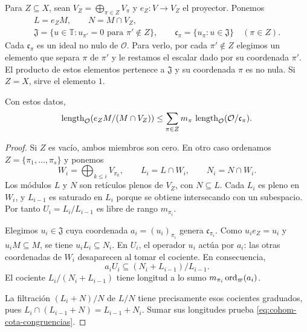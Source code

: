 Para $Z\subseteq X$, sean $V_Z=\bigoplus_{\pi\in Z}V_\pi$
y $e_Z:V\to V_Z$ el proyector. Ponemos
\begin{equation}
 \begin{gathered}
 L=e_ZM,\qquad N=M\cap V_Z,\\
 \mathfrak J=\{u\in\mathbb T:u_{\pi'}=0
       \text{ para }\pi'\notin Z\},\qquad
 \mathfrak c_\pi=\{u_\pi:u\in\mathfrak J\}\quad(\pi\in Z).
 \end{gathered}
 \label{eq:cohom-ideales}
\end{equation}
Cada $\mathfrak c_\pi$ es un ideal no nulo de $\mathcal O$.
Para verlo, por cada $\pi'\notin Z$ elegimos un elemento
que separa $\pi$ de $\pi'$ y le restamos el escalar
dado por su coordenada $\pi'$. El producto de estos
elementos pertenece a $\mathfrak J$ y su coordenada $\pi$
es no nula. Si $Z=X$, sirve el elemento $1$.

\begin{proposicion}
\label{prop:cohom-congruencias}
Con estos datos,
\begin{equation}
 \operatorname{length}_{\mathcal O}(e_ZM/(M\cap V_Z))
 \le\sum_{\pi\in Z}m_\pi\,
       \operatorname{length}_{\mathcal O}(\mathcal O/\mathfrak c_\pi).
 \label{eq:cohom-cota-congruencias}
\end{equation}
\end{proposicion}

\begin{proof}
Si $Z$ es vacío, ambos miembros son cero.
En otro caso ordenamos $Z=\{\pi_1,\ldots,\pi_s\}$ y ponemos
\[
 W_i=\bigoplus_{k\le i}V_{\pi_k},\qquad
 L_i=L\cap W_i,\qquad N_i=N\cap W_i.
\]
Los módulos $L$ y $N$ son retículos plenos de $V_Z$,
con $N\subseteq L$. Cada $L_i$ es pleno en $W_i$,
y $L_{i-1}$ es saturado en $L_i$ porque se obtiene
intersecando con un subespacio. Por tanto
$U_i=L_i/L_{i-1}$ es libre de rango $m_{\pi_i}$.

Elegimos $u_i\in\mathfrak J$ cuya coordenada
$a_i=(u_i)_{\pi_i}$ genera $\mathfrak c_{\pi_i}$.
Como $u_ie_Z=u_i$ y $u_iM\subseteq M$, se tiene
$u_iL_i\subseteq N_i$. En $U_i$, el operador $u_i$
actúa por $a_i$: las otras coordenadas de $W_i$
desaparecen al tomar el cociente. En consecuencia,
\[
 a_iU_i\subseteq (N_i+L_{i-1})/L_{i-1}.
\]
El cociente $L_i/(N_i+L_{i-1})$ tiene longitud a lo sumo
$m_{\pi_i}\operatorname{ord}_\varpi(a_i)$.

La filtración $(L_i+N)/N$ de $L/N$ tiene precisamente
esos cocientes graduados, pues
$L_i\cap(L_{i-1}+N)=L_{i-1}+N_i$.
Sumar sus longitudes prueba
\eqref{eq:cohom-cota-congruencias}.
\end{proof}

